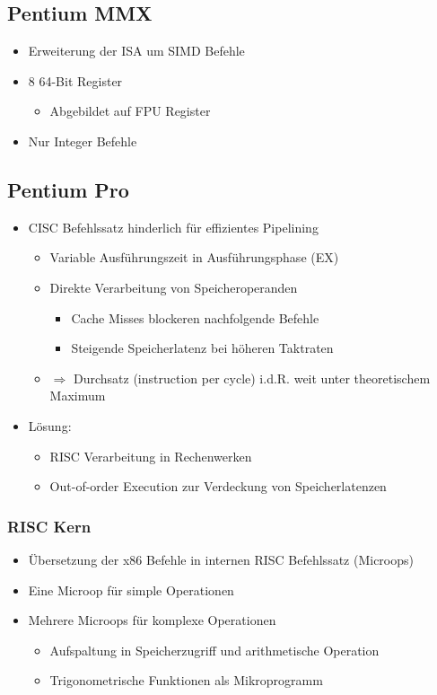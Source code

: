 \subsection{Pentium MMX}
\begin{itemize}
	\item Erweiterung der ISA um SIMD Befehle
	\item 8 64-Bit Register
	\begin{itemize}
		\item Abgebildet auf FPU Register
	\end{itemize}
	\item Nur Integer Befehle
\end{itemize}
\subsection{Pentium Pro}
\begin{itemize}
	\item CISC Befehlssatz hinderlich für effizientes Pipelining
	\begin{itemize}
		\item Variable Ausführungszeit in Ausführungsphase (EX)
		\item Direkte Verarbeitung von Speicheroperanden
		\begin{itemize}
			\item Cache Misses blockeren nachfolgende Befehle
			\item Steigende Speicherlatenz bei höheren Taktraten
		\end{itemize}
		\item \(\Rightarrow\) Durchsatz (instruction per cycle) i.d.R. weit unter theoretischem Maximum
	\end{itemize}
	\item Lösung:
	\begin{itemize}
		\item RISC Verarbeitung in Rechenwerken
		\item Out-of-order Execution zur Verdeckung von Speicherlatenzen
	\end{itemize}
\end{itemize}
\subsubsection{RISC Kern}
\begin{itemize}
	\item Übersetzung der x86 Befehle in internen RISC Befehlssatz (Microops)
	\item Eine Microop für simple Operationen
	\item Mehrere Microops für komplexe Operationen
	\begin{itemize}
		\item Aufspaltung in Speicherzugriff und arithmetische Operation
		\item Trigonometrische Funktionen als Mikroprogramm
	\end{itemize}
\end{itemize}
